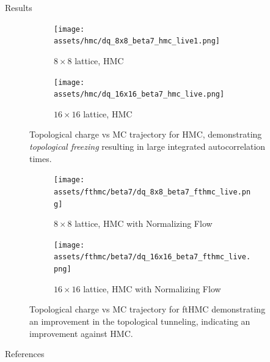 \documentclass[final]{beamer}
\newlength{\sepwidth}
\newlength{\colwidth}
\newcommand{\separatorcolumn}{\begin{column}{\sepwidth}\end{column}}
\begin{document}
\begin{frame}[t]
\begin{columns}[t]
\begin{column}{\colwidth}
  \begin{block}{Results}
    \begin{figure}
      \begin{subfigure}{0.45\columnwidth}
        \centering
        \texttt{[image: assets/hmc/dq\_8x8\_beta7\_hmc\_live1.png]}
        \caption{\label{fig:hmc8beta7}\(8\times8\) lattice, HMC}
      \end{subfigure}
      \begin{subfigure}{0.45\columnwidth}
        \centering
        \texttt{[image: assets/hmc/dq\_16x16\_beta7\_hmc\_live.png]}
        \caption{\label{fig:hmc16beta7}\(16\times16\) lattice, HMC}
      \end{subfigure}
      \caption{Topological charge vs MC trajectory for HMC, demonstrating \emph{topological freezing} resulting in large
      integrated autocorrelation times.}
    \end{figure}
    \begin{figure}
      \begin{subfigure}{0.45\columnwidth}
        \centering
          \texttt{[image: assets/fthmc/beta7/dq\_8x8\_beta7\_fthmc\_live.png]}
          \caption{\label{fig:fthmc8beta7}\(8\times8\) lattice, HMC with Normalizing Flow}
      \end{subfigure}
      \begin{subfigure}{0.45\columnwidth}
        \centering
        \texttt{[image: assets/fthmc/beta7/dq\_16x16\_beta7\_fthmc\_live.png]}
        \caption{\label{fig:fthmc16beta7}\(16\times16\) lattice, HMC with Normalizing Flow}
      \end{subfigure}
      \caption{Topological charge vs MC trajectory for ftHMC demonstrating an improvement in the topological tunneling,
      indicating an improvement against HMC.}
    \end{figure}
  \end{block}

  \begin{block}{References}
    \nocite{*}
    \footnotesize{}
  \end{block}
\end{column}
\separatorcolumn
\end{columns}
\end{frame}
\end{document}

